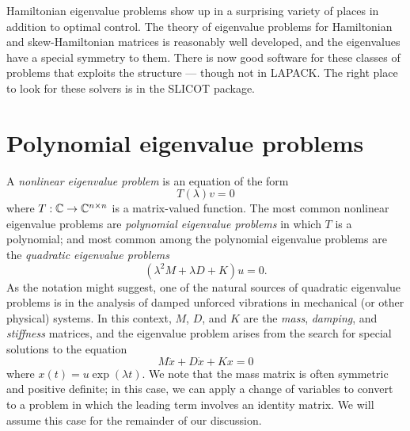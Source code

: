 \documentclass[12pt, leqno]{article} %
\begin{document}
Hamiltonian eigenvalue problems show up in a surprising variety of
places in addition to optimal control. The theory of eigenvalue problems
for Hamiltonian and skew-Hamiltonian matrices is reasonably well
developed, and the eigenvalues have a special symmetry to them.  There
is now good software for these classes of problems that exploits the
structure --- though not in LAPACK.  The right place to look for these
solvers is in the SLICOT package.

\section{Polynomial eigenvalue problems}

A {\em nonlinear eigenvalue problem} is an equation of the form
\[
  T(\lambda) v = 0
\]
where $T : \mathbb{C} \rightarrow \mathbb{C}^{n \times n}$ is a matrix-valued
function.  The most common nonlinear eigenvalue problems are
{\em polynomial eigenvalue problems} in which $T$ is a polynomial;
and most common among the polynomial eigenvalue problems are the
{\em quadratic eigenvalue problems}
\[
  (\lambda^2 M + \lambda D + K) u = 0.
\]
As the notation might suggest, one of the natural sources of
quadratic eigenvalue problems is in the analysis of damped
unforced vibrations in mechanical (or other physical) systems.
In this context, $M$, $D$, and $K$ are the {\em mass},
{\em damping}, and {\em stiffness} matrices, and the eigenvalue
problem arises from the search for special solutions to the
equation
\[
  M\ddot{x} + D\dot{x} + Kx = 0
\]
where $x(t) = u \exp(\lambda t)$.  We note that the mass matrix
is often symmetric and positive definite; in this case, we can
apply a change of variables to convert to a problem in which the
leading term involves an identity matrix.  We will assume this case
for the remainder of our discussion.
\end{document}
